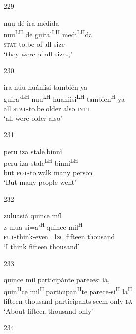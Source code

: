 \begin{itemize}
\item[229]
 
\glll   nuu d\'{e} ira m\'{e}d\v{i}da\\
nuu\textsuperscript{LH} de guira'\textsuperscript{LH} medi\textsuperscript{LH}da\\
 \textsc{stat}-to.be of all size \\
\glt  `they were of all sizes,'
 


\item[230]
 
\glll   ira n\'{u}u hu\'{a}niisi tambi\'{e}n ya\\
 guira'\textsuperscript{LH} nuu\textsuperscript{LH} huaniisi\textsuperscript{LH} tambien\textsuperscript{H} ya\\
 all \textsc{stat}-to.be older also \textsc{intj}\\
\glt `all were older also'
 



\item[231]
 
\glll   peru iza stale b\'{i}nn\v{i} \\
peru iza stale\textsuperscript{LH} binni\textsuperscript{LH}\\
but \textsc{pot}-to.walk many person\\
\glt `But many people went'
 


\item[232]
 
\glll   zuluasi\'{a} quince m\'{i}l\\
z-ulua-si=a'\textsuperscript{H} quince mil\textsuperscript{H}\\
 \textsc{fut}-think-even=\textsc{1sg} fifteen thousand\\
\glt `I think fifteen thousand'
 


\item[233]
 
\glll   qu\'{i}nce m\'{i}l particip\'{a}nte parecesi l\'{a},\\
 quin\textsuperscript{H}ce mil\textsuperscript{H} participan\textsuperscript{H}te parece-si\textsuperscript{H} la\textsuperscript{H} \\
fifteen thousand participants seem-only \textsc{la}\\
\glt `About fifteen thousand only'
 


\item[234]
 

\end{itemize}
